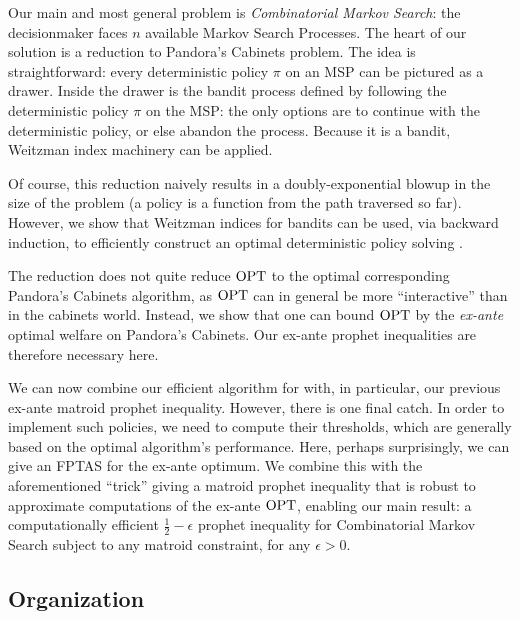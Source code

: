 Our main and most general problem is \emph{Combinatorial Markov Search}: the decisionmaker faces $n$ available Markov Search Processes.
The heart of our solution is a reduction to Pandora's Cabinets problem.
The idea is straightforward: every deterministic policy $\pi$ on an MSP can be pictured as a drawer.
Inside the drawer is the bandit process defined by following the deterministic policy $\pi$ on the MSP: the only options are to continue with the deterministic policy, or else abandon the process.
Because it is a bandit, Weitzman index machinery can be applied.

Of course, this reduction naively results in a doubly-exponential blowup in the size of the problem (a policy is a function from the path traversed so far).
However, we show that Weitzman indices for bandits can be used, via backward induction, to efficiently construct an optimal deterministic policy solving \SAUP{}.

The reduction does not quite reduce $\mathrm{OPT}$ to the optimal corresponding Pandora's Cabinets algorithm, as $\mathrm{OPT}$ can in general be more ``interactive'' than in the cabinets world.
Instead, we show that one can bound $\mathrm{OPT}$ by the \emph{ex-ante} optimal welfare on Pandora's Cabinets.
Our ex-ante prophet inequalities are therefore necessary here.

We can now combine our efficient algorithm for \SAUP{} with, in particular, our previous ex-ante matroid prophet inequality.
However, there is one final catch.
In order to implement such policies, we need to compute their thresholds, which are generally based on the optimal algorithm's performance.
Here, perhaps surprisingly, we can give an FPTAS for the ex-ante optimum.
We combine this with the aforementioned ``trick'' giving a matroid prophet inequality that is robust to approximate computations of the ex-ante $\mathrm{OPT}$, enabling our main result: a computationally efficient $\frac{1}{2}-\epsilon$ prophet inequality for Combinatorial Markov Search subject to any matroid constraint, for any $\epsilon > 0$.










\subsection{Organization} \label{subsec:org}

